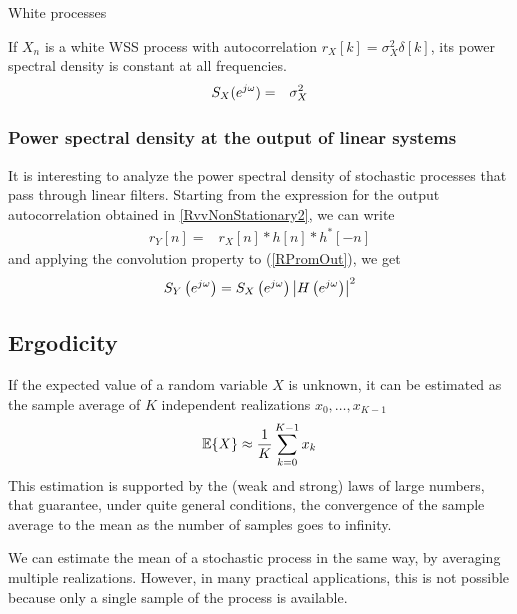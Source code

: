\begin{example}{White processes}

If $X_n$ is a white WSS process with autocorrelation $r_X[k]=\sigma_X^2\delta[k]$, its power spectral density is constant at all frequencies.
\begin{eqnarray}
S_X(e^{j \omega}) &=& \sigma_X^2
\end{eqnarray}
\end{example}


\subsubsection{Power spectral density at the output of linear systems}

It is interesting to analyze the power spectral density of stochastic processes that pass through linear filters. Starting from the expression for the output autocorrelation obtained in \eqref{RvvNonStationary2}, we can write
\begin{eqnarray}
r_Y[n] =&  r_X[n] * h[n] * h^*[-n]
\label{RPromOut}
\end{eqnarray}
and applying the convolution property to (\ref{RPromOut}), we get
\begin{equation}
S_Y\left(e^{j \omega}\right) = S_X\left(e^{j \omega}\right) \left| H\left(e^{j \omega}\right) \right|^2
\label{depout}
\end{equation}


\subsection{Ergodicity}
\label{sec:Ergodicity}

If the expected value of a random variable $X$ is unknown, it can be estimated as the sample average of $K$ independent realizations $x_0,\ldots, x_{K-1}$
\begin{equation}
\mathbb{E}\{X\} \approx \frac{1}{K} \sum_{k=0}^{K-1} x_k
\end{equation}
This estimation is supported by the (weak and strong) laws of large numbers, that guarantee, under quite general conditions, the convergence of the sample average to the mean as the number of samples goes to infinity.

We can estimate the mean of a stochastic process in the same way, by averaging multiple realizations. However, in many practical applications, this is not possible because only a single sample of the process is available.

